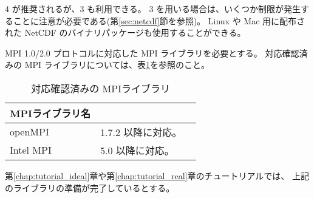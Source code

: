 {\netcdf}4 が推奨されるが、{\netcdf}3 も利用できる。
{\netcdf}3 を用いる場合は、いくつか制限が発生することに注意が必要である(第\ref{sec:netcdf}節を参照)。
Linux や Mac 用に配布された NetCDF のバイナリパッケージも使用することができる。


MPI 1.0/2.0 プロトコルに対応した MPI ライブラリを必要とする。
対応確認済みの MPI ライブラリについては、表\ref{tab:compatible_mpi}を参照のこと。

\begin{table}[htb]
\begin{center}
\caption{対応確認済みの MPIライブラリ}
\begin{tabularx}{150mm}{|l|X|X|} \hline
 \rowcolor[gray]{0.9} MPIライブラリ名 & \\ \hline
 openMPI   & 1.7.2 以降に対応。 \\ \hline
 Intel MPI & 5.0 以降に対応。 \\ \hline
\end{tabularx}
\label{tab:compatible_mpi}
\end{center}
\end{table}


第\ref{chap:tutorial_ideal}章や第\ref{chap:tutorial_real}章のチュートリアルでは、
上記のライブラリの準備が完了しているとする。

